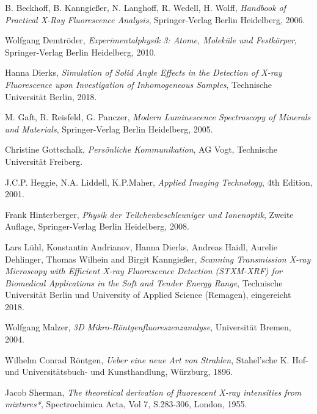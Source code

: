 \documentclass[12pt,a4paper,ngerman,twoside]{scrbook}
\begin{document}
\begin{thebibliography}{9}

  B. Beckhoff, B. Kanngießer, N. Langhoff, R. Wedell, H. Wolff,
  \textit{Handbook of Practical X-Ray Fluorescence Analysis},
  Springer-Verlag Berlin Heidelberg, 2006.
  
  Wolfgang Demtröder,
  \textit{Experimentalphysik 3: Atome, Moleküle und Festkörper},
  Springer-Verlag Berlin Heidelberg, 2010.  
  
  Hanna Dierks,
  \textit{Simulation of Solid Angle Effects in the Detection of X-ray Fluorescence upon Investigation of Inhomogeneous Samples},
  Technische Universität Berlin, 2018.

  M. Gaft, R. Reisfeld, G. Panczer,
  \textit{Modern Luminescence Spectroscopy of Minerals and Materials},
  Springer-Verlag Berlin Heidelberg, 2005.

  Christine Gottschalk,
  \textit{Persönliche Kommunikation},
  AG Vogt, Technische Universität Freiberg.

  J.C.P. Heggie, N.A. Liddell, K.P.Maher,
  \textit{Applied Imaging Technology},
  4th Edition, 2001.

  Frank Hinterberger,
  \textit{Physik der Teilchenbeschleuniger und Ionenoptik},
  Zweite Auflage, Springer-Verlag Berlin Heidelberg, 2008.

  Lars Lühl, Konstantin Andrianov, Hanna Dierks, Andreas Haidl, Aurelie Dehlinger, Thomas Wilhein and Birgit Kanngießer,
  \textit{Scanning Transmission X-ray Microscopy with Efficient X-ray Fluorescence Detection (STXM-XRF) for Biomedical Applications in the Soft and Tender Energy Range},
  Technische Universität Berlin und University of Applied Science (Remagen), eingereicht 2018.

  Wolfgang Malzer,
  \textit{3D Mikro-Röntgenfluoreszenzanalyse},
  Universität Bremen, 2004.

  Wilhelm Conrad Röntgen,
  \textit{Ueber eine neue Art von Strahlen},
  Stahel'sche K. Hof- und Universitätsbuch- und Kunsthandlung, Würzburg, 1896.
  
  Jacob Sherman,
  \textit{The theoretical derivation of fluorescent X-ray intensities from mixtures*},
  Spectrochimica Acta, Vol 7, S.283-306, London, 1955.
  
\end{thebibliography}
\end{document}
